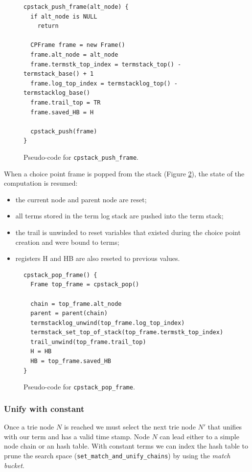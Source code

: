 \begin{figure}[H]
\begin{Verbatim}[fontsize=\small]
cpstack_push_frame(alt_node) {
  if alt_node is NULL
    return
  
  CPFrame frame = new Frame()
  frame.alt_node = alt_node
  frame.termstk_top_index = termstack_top() - termstack_base() + 1
  frame.log_top_index = termstacklog_top() - termstacklog_base()
  frame.trail_top = TR
  frame.saved_HB = H
  
  cpstack_push(frame)
}
\end{Verbatim}
\caption{Pseudo-code for \texttt{cpstack\_push\_frame}.}
\label{fig:cpstack_push_frame}
\end{figure}

When a choice point frame is popped from the stack (Figure \ref{fig:cpstack_pop_frame}),
the state of the computation is resumed:

\begin{itemize}
  \item the current node and parent node are reset;
  \item all terms stored in the term log stack are pushed into the term stack;
  \item the trail is unwinded to reset variables that existed during the choice point creation and were bound to terms;
  \item registers H and HB are also reseted to previous values.
\end{itemize}

\begin{figure}[H]
\begin{Verbatim}[fontsize=\small]
cpstack_pop_frame() {
  Frame top_frame = cpstack_pop()
  
  chain = top_frame.alt_node
  parent = parent(chain)
  termstacklog_unwind(top_frame.log_top_index)
  termstack_set_top_of_stack(top_frame.termstk_top_index)
  trail_unwind(top_frame.trail_top)
  H = HB
  HB = top_frame.saved_HB
}
\end{Verbatim}
\caption{Pseudo-code for \texttt{cpstack\_pop\_frame}.}
\label{fig:cpstack_pop_frame}
\end{figure}

\subsubsection{Unify with constant}

Once a trie node $N$ is reached we must select the next trie node $N'$ that unifies with our term and has a valid time stamp. Node $N$ can lead either to a simple node chain or an hash table.
With constant terms we can index the hash table to prune the search space (\texttt{set\_match\_and\_unify\_chains}) by using the \textit{match bucket}.

